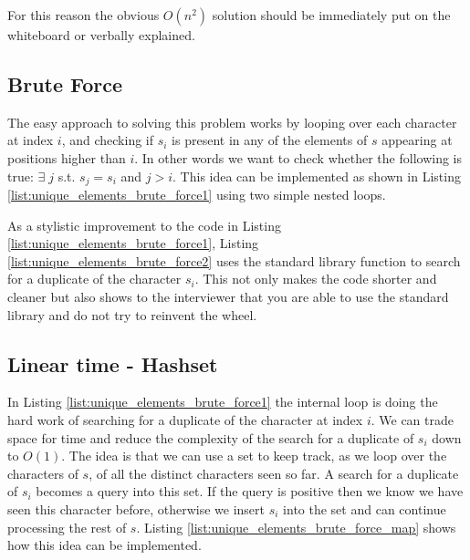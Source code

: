 For this reason the obvious $O(n^2)$ solution should be
immediately put on the whiteboard or verbally explained.

\subsection{Brute Force}
The easy approach to solving this problem works by looping over each character at index $i$,
and checking if $s_i$ is present in any of the elements  of $s$ appearing at positions higher than $i$. 
In other words we want to check whether the following is true: $\exists \; j $ s.t.  $s_j=s_i$ and $j>i$.
This idea can be implemented as shown in
Listing \ref{list:unique_elements_brute_force1} using two simple nested loops.




As a stylistic improvement to the code in Listing \ref{list:unique_elements_brute_force1}, Listing
\ref{list:unique_elements_brute_force2}  uses the \CC standard library function  to
search for a duplicate of the character $s_i$. 
This not only makes the code shorter and cleaner
but also shows to the interviewer that you are able to use the standard library and do not try to reinvent the wheel.



\subsection{Linear time - Hashset}
In Listing \ref{list:unique_elements_brute_force1} the internal loop is doing the hard work of
searching for a duplicate of the character at index $i$. We can trade space for time and reduce the
complexity of the  search for a duplicate of $s_i$ down to $O(1)$.
The idea is that we can use a set to keep track, as we loop over the characters of $s$, of all the distinct characters seen so far.
A search for a duplicate of $s_i$ becomes a query into this set. If the query is positive then we know we have seen this character before, otherwise 
we insert $s_i$ into the set and can continue  processing the rest of $s$.
Listing \ref{list:unique_elements_brute_force_map} shows how this idea can be implemented.


